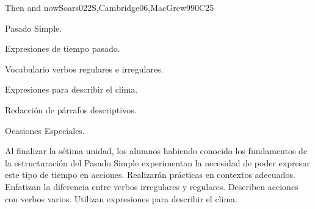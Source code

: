 \begin{syllabus}
\begin{unit}{Then and now}{}{Soars022S,Cambridge06,MacGrew99}{0}{C25}
   \begin{topics}
      \item Pasado Simple.
      \item Expresiones de tiempo pasado.
      \item Vocabulario verbos regulares e irregulares.
      \item Expresiones para describir el clima. 
      \item Redacción de párrafos descriptivos.
      \item Ocasiones Especiales.
   \end{topics}

   \begin{learningoutcomes}
      \item Al finalizar la sétima unidad, los alumnos habiendo conocido los fundamentos de la estructuración del Pasado Simple experimentan la necesidad de poder expresar este tipo de tiempo en acciones. Realizarán prácticas en contextos adecuados. Enfatizan la diferencia entre verbos irregulares y regulares. Describen acciones con verbos varios. Utilizan expresiones para describir el clima.
   \end{learningoutcomes}
\end{unit}

\begin{coursebibliography}
\end{coursebibliography}
\end{syllabus}
%
